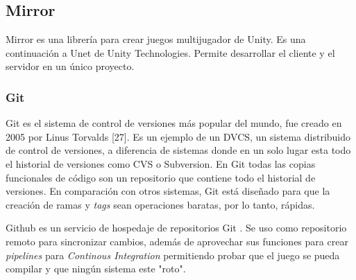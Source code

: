 \subsection{Mirror}
Mirror es una librería para crear juegos multijugador de Unity. Es una continuación a Unet de Unity Technologies. Permite desarrollar el cliente y el servidor en un único proyecto.

\subsubsection{Git}
Git es el sistema de control de versiones más popular del mundo, fue creado en 2005 por Linus Torvalds [27]. Es un ejemplo de un DVCS, un sistema distribuido de control de versiones, a diferencia de sistemas donde en un solo lugar esta todo el historial de versiones como CVS o Subversion. En Git todas las copias funcionales de código son un repositorio que contiene todo el historial de versiones.
En comparación con otros sistemas, Git está diseñado para que la creación de ramas y \textit{tags} sean operaciones baratas, por lo tanto, rápidas.

Github es un servicio de hospedaje de repositorios Git \cite{finley2012a}. Se uso como repositorio remoto para sincronizar cambios, además de aprovechar sus funciones para crear \textit{pipelines} para \textit{Continous Integration} permitiendo probar que el juego se pueda compilar y que ningún sistema este "roto".
